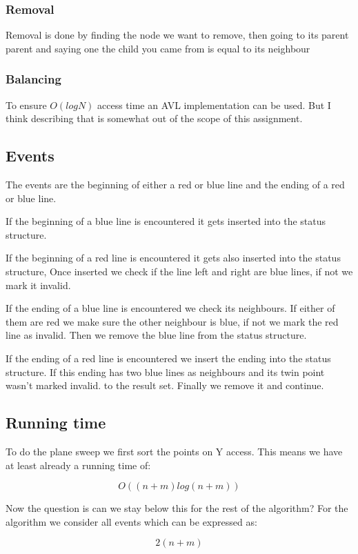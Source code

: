\documentclass{article}
\begin{document}
\subsubsection{Removal}
Removal is done by finding the node we want to remove, then going to its
parent parent and saying one the child you came from is equal to its neighbour

\subsubsection{Balancing}
To ensure $O(log N)$ access time an AVL implementation
can be used. But I think describing that is somewhat out of the scope
of this assignment.

\subsection{Events}
The events are the beginning of either a red or blue line and the ending of
a red or blue line.

If the beginning of a blue line is encountered it gets inserted into the
status structure.

If the beginning of a red line is encountered it gets also
inserted into the status structure, Once inserted we check if the line left
and right are blue lines, if not we mark it invalid.

If the ending of a blue line is encountered we check its neighbours. If either
of them are red we make sure the other neighbour is blue, if not we mark the red line as invalid.
Then we remove the blue line from the status structure.

If the ending of a red line is encountered we insert the ending into the status structure.
If this ending has two blue lines as neighbours and its twin point wasn't marked invalid.
to the result set.
Finally we remove it and continue.

\subsection{Running time}
To do the plane sweep we first sort the points on Y access. This means
we have at least already a running time of:

\[ O((n+m) log (n+m))\]

Now the question is can we stay below this for the rest of the algorithm?
For the algorithm we consider all events which can be expressed as:

\[ 2(n+m) \]
\end{document}
